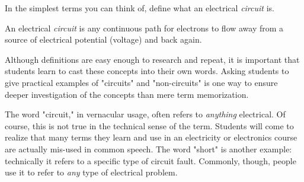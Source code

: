 

In the simplest terms you can think of, define what an electrical {\it circuit} is.







An electrical {\it circuit} is any continuous path for electrons to flow away from a source of electrical potential (voltage) and back again.







Although definitions are easy enough to research and repeat, it is important that students learn to cast these concepts into their own words.  Asking students to give practical examples of "circuits" and "non-circuits" is one way to ensure deeper investigation of the concepts than mere term memorization.

The word "circuit," in vernacular usage, often refers to {\it anything} electrical.  Of course, this is not true in the technical sense of the term.  Students will come to realize that many terms they learn and use in an electricity or electronics course are actually mis-used in common speech.  The word "short" is another example: technically it refers to a specific type of circuit fault.  Commonly, though, people use it to refer to {\it any} type of electrical problem.





